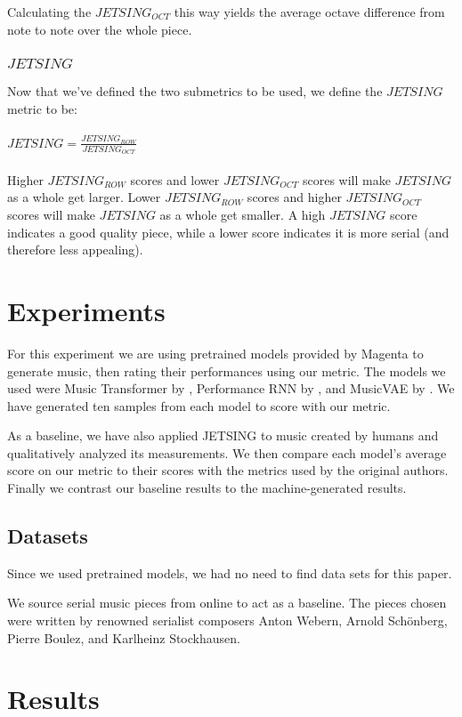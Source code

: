 \documentclass[11pt]{article}
\begin{document}
Calculating the $JETSING_{OCT}$ this way yields the average octave difference from note to note over the whole piece.

\subsubsection{$JETSING$}
Now that we've defined the two submetrics to be used, we define the $JETSING$ metric to be:
\\ \\
\LARGE
$ JETSING = \frac{JETSING_{ROW}}{JETSING_{OCT}}$
\normalsize
\\ \\
\indent Higher $JETSING_{ROW}$ scores and lower $JETSING_{OCT}$ scores will make $JETSING$ as a whole get larger.
Lower $JETSING_{ROW}$ scores and higher $JETSING_{OCT}$ scores will make $JETSING$ as a whole get smaller.
A high $JETSING$ score indicates a good quality piece, while a lower score indicates it is more serial (and therefore less appealing).

\section{Experiments}
For this experiment we are using pretrained models provided by Magenta to generate music, then rating their performances using our metric.
The models we used were Music Transformer by \cite{huang2018music}, Performance RNN by \cite{performance-rnn-2017}, and MusicVAE by \cite{musicVAE}.
We have generated ten samples from each model to score with our metric.

As a baseline, we have also applied JETSING to music created by humans and qualitatively analyzed its measurements.
We then compare each model's average score on our metric to their scores with the metrics used by the original authors.
Finally we contrast our baseline results to the machine-generated results.

\subsection{Datasets}
Since we used pretrained models, we had no need to find data sets for this paper.

We source serial music pieces from online to act as a baseline.
The pieces chosen were written by renowned serialist composers Anton Webern, Arnold Schönberg, Pierre Boulez, and  Karlheinz Stockhausen.

\section{Results}
\end{document}
